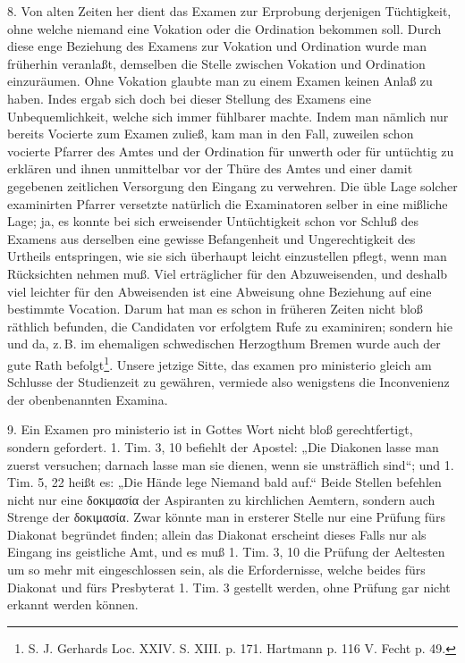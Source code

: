 8. Von alten Zeiten her dient das Examen zur Erprobung derjenigen Tüchtigkeit, ohne welche niemand eine Vokation oder die Ordination bekommen soll. Durch diese enge Beziehung des Examens zur Vokation und Ordination wurde man früherhin veranlaßt, demselben die Stelle zwischen Vokation und Ordination einzuräumen. Ohne Vokation glaubte man zu einem Examen keinen Anlaß zu haben. Indes ergab sich doch bei dieser Stellung des Examens eine Unbequemlichkeit, welche sich immer fühlbarer machte. Indem man nämlich nur bereits Vocierte zum Examen zuließ, kam man in den Fall, zuweilen schon vocierte Pfarrer des Amtes und der Ordination für unwerth oder für untüchtig zu erklären und ihnen unmittelbar vor der Thüre des Amtes und einer damit gegebenen zeitlichen Versorgung den Eingang zu verwehren. Die üble Lage
solcher examinirten Pfarrer versetzte natürlich die Examinatoren selber in eine mißliche Lage; ja, es konnte bei sich erweisender Untüchtigkeit schon vor Schluß des Examens aus derselben eine gewisse Befangenheit und Ungerechtigkeit des Urtheils entspringen, wie sie sich überhaupt leicht einzustellen pflegt, wenn man Rücksichten nehmen muß. Viel erträglicher für den Abzuweisenden, und deshalb viel leichter für den Abweisenden ist eine Abweisung ohne Beziehung auf eine bestimmte Vocation. Darum hat man es schon in früheren Zeiten nicht bloß räthlich befunden, die Candidaten vor erfolgtem Rufe zu examiniren; sondern hie und da, z.\,B. im ehemaligen schwedischen Herzogthum Bremen wurde auch der gute Rath befolgt\footnote{S. J. Gerhards Loc. XXIV. S. XIII. p. 171. Hartmann p. 116 V. Fecht p. 49.}. Unsere jetzige Sitte, das examen pro ministerio gleich am Schlusse der Studienzeit zu gewähren, vermiede also wenigstens die Inconvenienz der obenbenannten Examina.

9. Ein Examen pro ministerio ist in Gottes Wort nicht bloß gerechtfertigt, sondern gefordert. 1. Tim. 3, 10 befiehlt der Apostel: „Die Diakonen lasse man zuerst versuchen; darnach lasse man sie dienen, wenn sie unsträflich sind“; und 1. Tim. 5, 22 heißt es: „Die Hände lege Niemand bald auf.“ Beide Stellen befehlen nicht nur eine δοκιμασία der Aspiranten zu kirchlichen Aemtern, sondern auch Strenge der δοκιμασία. Zwar könnte man in ersterer Stelle nur eine Prüfung fürs Diakonat begründet finden; allein das Diakonat erscheint dieses Falls nur als
Eingang ins geistliche Amt, und es muß 1. Tim. 3, 10 die Prüfung der Aeltesten um so mehr mit eingeschlossen sein, als die Erfordernisse, welche beides fürs Diakonat und fürs Presbyterat 1. Tim. 3 gestellt werden, ohne Prüfung gar nicht erkannt werden können.

